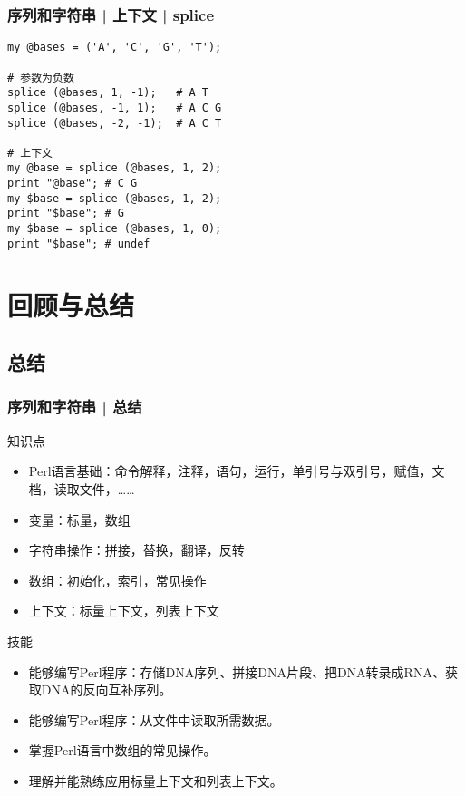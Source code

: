 \begin{frame}[fragile]
  \frametitle{序列和字符串 | 上下文 | splice}
\begin{lstlisting}
my @bases = ('A', 'C', 'G', 'T');

# 参数为负数
splice (@bases, 1, -1);   # A T
splice (@bases, -1, 1);   # A C G
splice (@bases, -2, -1);  # A C T

# 上下文
my @base = splice (@bases, 1, 2);
print "@base"; # C G
my $base = splice (@bases, 1, 2);
print "$base"; # G
my $base = splice (@bases, 1, 0);
print "$base"; # undef
\end{lstlisting}
\end{frame}

\section{回顾与总结}
\subsection{总结}
\begin{frame}
  \frametitle{序列和字符串 | 总结}
  \begin{block}{知识点}
    \begin{itemize}
      \item Perl语言基础：命令解释，注释，语句，运行，单引号与双引号，赋值，文档，读取文件，……
      \item 变量：标量，数组
      \item 字符串操作：拼接，替换，翻译，反转
      \item 数组：初始化，索引，常见操作
      \item 上下文：标量上下文，列表上下文
    \end{itemize}
  \end{block}
  \pause
  \begin{block}{技能}
    \begin{itemize}
      \item 能够编写Perl程序：存储DNA序列、拼接DNA片段、把DNA转录成RNA、获取DNA的反向互补序列。
      \item 能够编写Perl程序：从文件中读取所需数据。
      \item 掌握Perl语言中数组的常见操作。
      \item 理解并能熟练应用标量上下文和列表上下文。
    \end{itemize}
  \end{block}
\end{frame}

